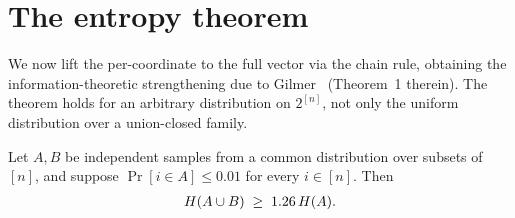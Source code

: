 \section{The entropy theorem}
\label{sec:main-thm}

We now lift the per-coordinate  to the full vector via the
chain rule, obtaining the information-theoretic strengthening due to
Gilmer~\cite{gilmer2022unionclosed} (Theorem~1 therein). The theorem holds for
an arbitrary distribution on $2^{[n]}$, not only the uniform distribution over a
union-closed family.

\begin{theorem}
\label{thm:gilmer-entropy}
Let $A, B$ be independent samples from a common distribution over subsets of
$[n]$, and suppose $\Pr[i \in A] \le 0.01$ for every $i \in [n]$. Then
\begin{align*}
H(A \cup B) \;\ge\; 1.26\,H(A).
\end{align*}
\end{theorem}

